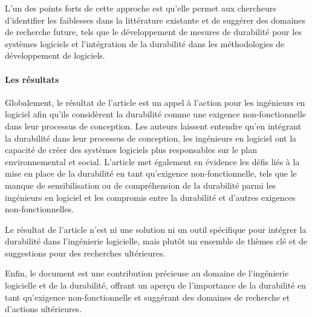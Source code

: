 L'un des points forts de cette approche est qu'elle permet aux chercheurs d'identifier les faiblesses dans la littérature existante et de suggérer des domaines de recherche future, tels que le développement de mesures de durabilité pour les systèmes logiciels et l'intégration de la durabilité dans les méthodologies de développement de logiciels.

\paragraph{Les résultats}
Globalement, le résultat de l'article est un appel à l'action pour les ingénieurs en logiciel afin qu'ils considèrent la durabilité comme une exigence non-fonctionnelle dans leur processus de conception. Les auteurs laissent entendre qu'en intégrant la durabilité dans leur processus de conception, les ingénieurs en logiciel ont la capacité de créer des systèmes logiciels plus responsables sur le plan environnemental et social. L'article met également en évidence les défis liés à la mise en place de la durabilité en tant qu'exigence non-fonctionnelle, tels que le manque de sensibilisation ou de compréhension de la durabilité parmi les ingénieurs en logiciel et les compromis entre la durabilité et d'autres exigences non-fonctionnelles.

Le résultat de l'article n'est ni une solution ni un outil spécifique pour intégrer la durabilité dans l'ingénierie logicielle, mais plutôt un ensemble de thèmes clé et de suggestions pour des recherches ultérieures.

Enfin, le document est une contribution précieuse au domaine de l'ingénierie logicielle et de la durabilité, offrant un aperçu de l'importance de la durabilité en tant qu'exigence non-fonctionnelle et suggérant des domaines de recherche et d'actions ultérieures.
